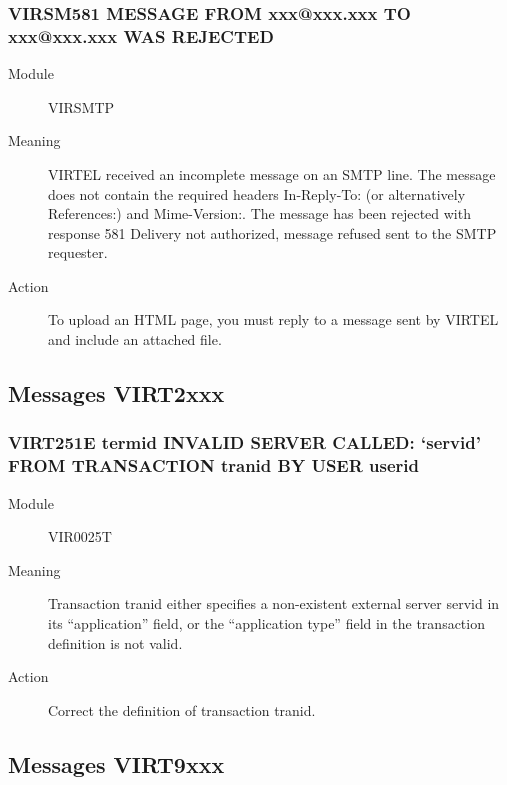 \documentclass[letterpaper,10pt,english]{sphinxmanual}
\begin{document}
\subsubsection{VIRSM581 MESSAGE FROM xxx@xxx.xxx TO xxx@xxx.xxx WAS REJECTED}
\label{\detokenize{messages:virsm581-message-from-xxx-xxx-xxx-to-xxx-xxx-xxx-was-rejected}}\begin{description}
\item[{Module}] \leavevmode
VIRSMTP

\item[{Meaning}] \leavevmode
VIRTEL received an incomplete message on an SMTP line. The message does not contain the required headers In-Reply-To: (or alternatively References:) and Mime-Version:. The message has been rejected with response 581 Delivery not authorized, message refused sent to the SMTP requester.

\item[{Action}] \leavevmode
To upload an HTML page, you must reply to a message sent by VIRTEL and include an attached file.

\end{description}


\subsection{Messages VIRT2xxx}
\label{\detokenize{messages:messages-virt2xxx}}

\subsubsection{VIRT251E termid INVALID SERVER CALLED: ‘servid’ FROM TRANSACTION tranid BY USER userid}
\label{\detokenize{messages:virt251e-termid-invalid-server-called-servid-from-transaction-tranid-by-user-userid}}\begin{description}
\item[{Module}] \leavevmode
VIR0025T

\item[{Meaning}] \leavevmode
Transaction tranid either specifies a non-existent external server servid in its “application” field, or the “application type” field in the transaction definition is not valid.

\item[{Action}] \leavevmode
Correct the definition of transaction tranid.

\end{description}


\subsection{Messages VIRT9xxx}
\label{\detokenize{messages:messages-virt9xxx}}
\end{document}
